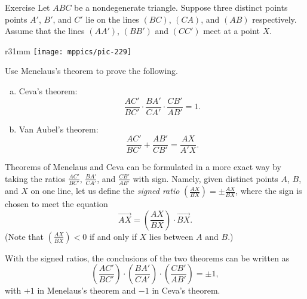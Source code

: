{

\begin{thm}{Exercise}\label{thm:ceva-affine}\label{ex:ceva-affine}
Let $ABC$ be a nondegenerate triangle.
Suppose three distinct points points $A'$, $B'$, and $C'$ lie on the lines $(BC)$, $(CA)$, and $(AB)$ respectively.
Assume that the lines $(AA')$, $(BB')$ and $(CC')$ meet at a point $X$.

\begin{wrapfigure}{r}{31mm}
\centering
\vskip-2mm
\texttt{[image: mppics/pic-229]}
\end{wrapfigure}

Use Menelaus's theorem to prove the following.

\begin{enumerate}[(a)]
\item Ceva's theorem:
\[\frac{AC'}{BC'}\cdot\frac{BA'}{CA'}\cdot \frac{CB'}{AB'}=1.\]
\item Van Aubel's theorem:
\[\frac{AC'}{BC'}+\frac{AB'}{CB'}=\frac{AX}{A'X}.\]
\end{enumerate}
\end{thm}

}

Theorems of Menelaus and Ceva can be formulated in a more exact way by taking the ratios $\frac{AC'}{BC'}$, $\frac{BA'}{CA'}$, and $\frac{CB'}{AB'}$ with sign.
Namely, given distinct points $A$, $B$, and $X$ on one line, let us define the \emph{signed ratio} $(\frac{AX}{BX})=\pm\frac{AX}{BX}$, where the sign is chosen to meet the equation
\[\overrightarrow{AX}=\left(\frac{AX}{BX}\right)\cdot \overrightarrow{BX}.\]
(Note that $(\frac{AX}{BX})<0$ if and only if $X$ lies between $A$ and $B$.)


With the signed ratios, the conclusions of the two theorems can be written as
\[\left(\frac{AC'}{BC'}\right)\cdot\left(\frac{BA'}{CA'}\right)\cdot \left(\frac{CB'}{AB'}\right)=\pm1,\]
with $+1$ in Menelaus's theorem and $-1$ in Ceva's theorem.

